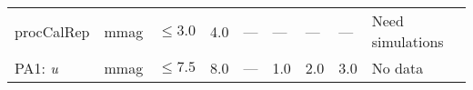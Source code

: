 \documentclass[DM,lsstdraft,toc]{lsstdoc}
\begin{document}
\begin{longtable}[]{@{}lllllllll@{}}
\begin{minipage}[t]{0.12\columnwidth}
procCalRep\strut
\end{minipage} & \begin{minipage}[t]{0.06\columnwidth}\raggedright\strut
mmag\strut
\end{minipage} & \begin{minipage}[t]{0.10\columnwidth}\raggedright\strut
\(\leq 3.0\)\strut
\end{minipage} & \begin{minipage}[t]{0.10\columnwidth}\raggedright\strut
4.0\strut
\end{minipage} & \begin{minipage}[t]{0.10\columnwidth}\raggedright\strut
---\strut
\end{minipage} & \begin{minipage}[t]{0.10\columnwidth}\raggedright\strut
---\strut
\end{minipage} & \begin{minipage}[t]{0.10\columnwidth}\raggedright\strut
---\strut
\end{minipage} & \begin{minipage}[t]{0.10\columnwidth}\raggedright\strut
---\strut
\end{minipage} & \begin{minipage}[t]{0.18\columnwidth}\raggedright\strut
Need simulations\strut
\end{minipage}\tabularnewline
\begin{minipage}[t]{0.12\columnwidth}\raggedright\strut
PA1: \emph{u}\strut
\end{minipage} & \begin{minipage}[t]{0.06\columnwidth}\raggedright\strut
mmag\strut
\end{minipage} & \begin{minipage}[t]{0.10\columnwidth}\raggedright\strut
\(\leq 7.5\)\strut
\end{minipage} & \begin{minipage}[t]{0.10\columnwidth}\raggedright\strut
8.0\strut
\end{minipage} & \begin{minipage}[t]{0.10\columnwidth}\raggedright\strut
---\strut
\end{minipage} & \begin{minipage}[t]{0.10\columnwidth}\raggedright\strut
1.0 \strut
\end{minipage} & \begin{minipage}[t]{0.10\columnwidth}\raggedright\strut
2.0 \strut
\end{minipage} & \begin{minipage}[t]{0.10\columnwidth}\raggedright\strut
3.0 \strut
\end{minipage} & \begin{minipage}[t]{0.18\columnwidth}\raggedright\strut
No data\strut
\end{minipage}\tabularnewline
\end{longtable}
\end{document}

